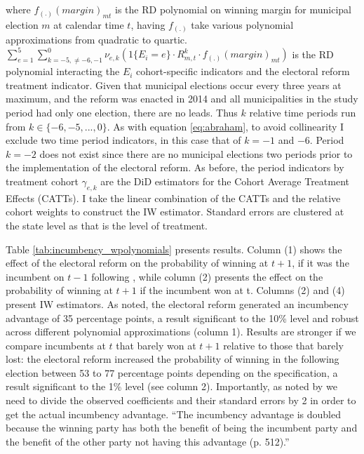 \documentclass[12pt]{amsart}
\numberwithin{equation}{section}
\theoremstyle{definition}
\theoremstyle{definition}
\theoremstyle{definition}
\begin{document}
where $f_{(.)}(margin)_{mt}$ is the RD polynomial on winning margin for municipal election $m$ at calendar time $t$, having $f_{(.)}$ take various polynomial approximations from quadratic to quartic. $\sum^5_{e=1} \sum^{0}_{k=-5, \neq {-6,-1}} \nu_{e,k}(1\{E_i=e\} \cdot R^k_{m,t} \cdot  f_{(.)}(margin)_{mt} ) $ is the RD polynomial interacting the $E_i$ cohort-specific indicators and the electoral reform treatment indicator. Given that municipal elections occur every three years at maximum, and the reform was enacted in 2014 and all municipalities in the study period had only one election, there are no leads. Thus $k$ relative time periods run from  $k \in\{-6,-5,...,0\}$. As with equation \ref{eq:abraham}, to avoid collinearity I exclude two time period indicators, in this case that of $k=-1$ and $-6$.  Period $k=-2$ does not exist since there are no municipal elections two periods prior to the implementation of the electoral reform. As before, the period indicators by treatment cohort  $\gamma_{e,k}$ are the DiD estimators for the Cohort Average Treatment Effects (CATTs). I take the linear combination of the CATTs and the relative cohort weights to construct the IW estimator. Standard errors are clustered at the state level as that is the level of treatment. 
 
                
 
Table \ref{tab:incumbency_wpolynomials} presents results. Column (1) shows the effect of the electoral reform on the probability of winning at $t+1$, if it was the incumbent on $t-1$ following \citet{klasnja_titiunik_2017}, while column (2) presents the effect on the probability of winning at $t+1$ if the incumbent won at t. Columns (2) and (4) present IW estimators. As noted, the electoral reform generated an incumbency advantage of 35 percentage points, a result significant to the 10\% level and robust across different polynomial approximations (column 1). Results are stronger if we compare incumbents at $t$ that barely won at $t+1$ relative to those that barely lost: the electoral reform increased the probability of winning in the following election between 53 to 77 percentage points depending on the specification, a result significant to the 1\% level (see column 2). Importantly, as noted by \citet{fowler_hall_2014} we need to divide the observed coefficients and their standard errors by 2 in order to get the actual incumbency advantage. ``The  incumbency advantage is doubled because the winning party has both the benefit of being the incumbent party and the benefit of the other party not having this advantage (p. 512).'' 
       
\end{document}
